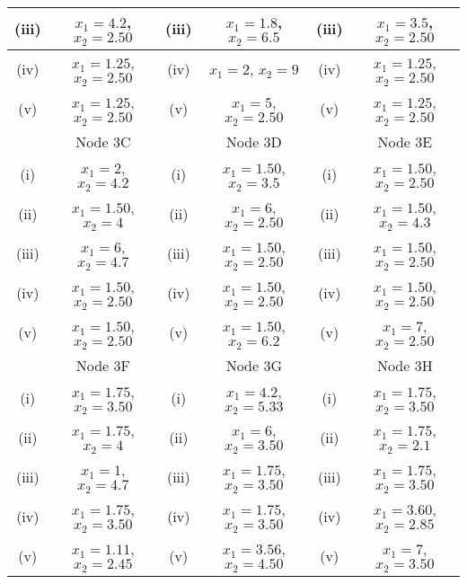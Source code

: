 \documentclass[a4paper,12pt]{article}
\begin{document}
\begin{tabular}{||c|c||c|c||c|c||}
		\hline (iii) & $x_1= 4.2$, $x_2= 2.50$  & (iii) & $x_1= 1.8$, $x_2 =6.5 $ &(iii) & $x_1= 3.5$, $x_2= 2.50$ \\  \hline
		\hline (iv)  & $x_1= 1.25$, $x_2= 2.50$  & (iv) & $x_1= 2$, $x_2 = 9$ & (iv)  & $x_1= 1.25$, $x_2= 2.50$\\  \hline
		\hline (v) & $x_1= 1.25$, $x_2= 2.50$ & (v) & $x_1= 5 $, $x_2= 2.50$  &(v) & $x_1= 1.25$, $x_2= 2.50$\\  \hline
		\hline 
		\hline  & Node 3C &   & Node 3D &  & Node 3E  \\  \hline
		\hline (i) & $x_1= 2 $, $x_2 = 4.2$ & (i) & $x_1= 1.50$, $x_2 = 3.5$ &  (i)  & $x_1= 1.50$, $x_2= 2.50$\\  \hline
		\hline (ii)  & $x_1= 1.50$, $x_2 = 4 $  & (ii)   & $x_1= 6 $, $x_2= 2.50$ & (ii) & $x_1= 1.50$, $x_2 = 4.3$ \\  \hline
		\hline (iii) & $x_1= 6$, $x_2 = 4.7 $  & (iii) & $x_1= 1.50$, $x_2= 2.50$ &(iii) & $x_1= 1.50$, $x_2= 2.50$ \\  \hline
		\hline (iv)  & $x_1= 1.50$, $x_2= 2.50$  & (iv)  & $x_1= 1.50$, $x_2= 2.50$ & (iv)  & $x_1= 1.50$, $x_2= 2.50$\\  \hline
		\hline (v) & $x_1= 1.50$, $x_2= 2.50$ & (v)   & $x_1= 1.50$, $x_2 = 6.2$  &(v) & $x_1= 7$, $x_2= 2.50$\\  \hline
		\hline 
		\hline  &  Node 3F &  & Node 3G &   & Node 3H \\  \hline
		\hline (i) & $x_1= 1.75$, $x_2= 3.50$ & (i) & $x_1= 4.2$, $x_2 = 5.33$  & (i)  & $x_1= 1.75$, $x_2= 3.50$\\  \hline
		\hline (ii)  & $x_1= 1.75$, $x_2 = 4$  & (ii) & $x_1= 6 $, $x_2= 3.50$ & (ii) & $x_1= 1.75$, $x_2 = 2.1$ \\  \hline
		\hline (iii) & $x_1= 1$, $x_2 = 4.7 $   & (iii) & $x_1= 1.75$, $x_2= 3.50$ &(iii) & $x_1= 1.75$, $x_2= 3.50$ \\  \hline
		\hline (iv)  & $x_1= 1.75$, $x_2= 3.50$  & (iv) & $x_1= 1.75$, $x_2= 3.50$ & (iv)  & $x_1= 3.60 $, $x_2 = 2.85$\\  \hline
		\hline (v) & $x_1= 1.11$, $x_2 = 2.45$ & (v)  & $x_1= 3.56$, $x_2 = 4.50 $ & (v) & $x_1= 7$, $x_2= 3.50$\\  \hline
		\hline 
		
	\end{tabular} 
\end{document}
